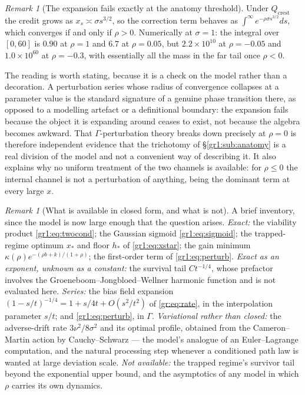 \documentclass[11pt]{article}
\numberwithin{equation}{section}
\theoremstyle{plain}
\theoremstyle{definition}
\theoremstyle{remark}
\newtheorem{remark}[theorem]{Remark}
\begin{document}
\begin{remark}[The expansion fails exactly at the anatomy threshold]
\label{gr1:rem:perturbfail}
Under $Q_{\mathrm{crest}}$ the credit grows as $x_s\asymp\sigma
s^{3/2}$, so the correction term behaves as
$\int^\infty e^{-\rho\sigma s^{3/2}}ds$, which converges if and only if
$\rho>0$. Numerically at $\sigma=1$: the integral over $[0,60]$ is
$0.90$ at $\rho=1$ and $6.7$ at $\rho=0.05$, but $2.2\times10^{10}$ at
$\rho=-0.05$ and $1.0\times10^{60}$ at $\rho=-0.3$, with essentially all
the mass in the far tail once $\rho<0$.

The reading is worth stating, because it is a check on the model rather
than a decoration. A perturbation series whose radius of convergence
collapses at a parameter value is the standard signature of a genuine
phase transition there, as opposed to a modelling artefact or a
definitional boundary: the expansion fails because the object it is
expanding around ceases to exist, not because the algebra becomes
awkward. That $\Gamma$-perturbation theory breaks down precisely at
$\rho=0$ is therefore independent evidence that the trichotomy of
\S\ref{gr1:sub:anatomy} is a real division of the model and not a
convenient way of describing it. It also explains why no uniform
treatment of the two channels is available: for $\rho\le0$ the internal
channel is not a perturbation of anything, being the dominant term at
every large $x$.
\end{remark}

\begin{remark}[What is available in closed form, and what is not]
\label{gr1:rem:closedform}
A brief inventory, since the model is now large enough that the question
arises. \emph{Exact:} the viability product \eqref{gr1:eq:twocond}; the
Gaussian sigmoid \eqref{gr1:eq:sigmoid}; the trapped-regime optimum
$x_\ast$ and floor $h_\ast$ of \eqref{gr1:eq:xstar}; the gain minimum
$\kappa(\rho)e^{-(\rho b+k)/(1+\rho)}$; the first-order term of
\eqref{gr1:eq:perturb}. \emph{Exact as an exponent, unknown as a
constant:} the survival tail $Ct^{-1/4}$, whose prefactor involves the
Groeneboom--Jongbloed--Wellner harmonic function and is not evaluated
here. \emph{Series:} the bias field expansion
$(1-s/t)^{-1/4}=1+s/4t+O(s^2/t^2)$ of \eqref{gr:eq:rate}, in the
interpolation parameter $s/t$; and \eqref{gr1:eq:perturb}, in $\Gamma$.
\emph{Variational rather than closed:} the adverse-drift rate
$3\nu^{2}/8\sigma^{2}$ and its optimal profile, obtained from the
Cameron--Martin action by Cauchy--Schwarz --- the model's analogue of an
Euler--Lagrange computation, and the natural processing step whenever a
conditioned path law is wanted at large deviation scale.
\emph{Not available:} the trapped regime's survivor tail beyond the
exponential upper bound, and the asymptotics of any model in which
$\rho$ carries its own dynamics.
\end{remark}
\end{document}
